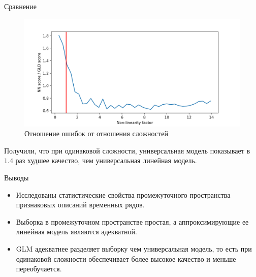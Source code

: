 \documentclass{beamer}
\begin{document}
\begin{frame}{Сравнение}
    \begin{figure}[ht]
        \centering
          \includegraphics[width=\textwidth]{../pics/loss_and_std_of_nl_factor.png}
          \caption{Отношение ошибок от отношения сложностей}
    \end{figure}

    Получили, что при одинаковой сложности, универсальная модель показывает
    в $1.4$ раз худшее качество, чем универсальная линейная модель.

\end{frame}
\begin{frame}{Выводы}
    \begin{itemize}
        \item Исследованы статистические свойства промежуточного пространства
        признаковых описаний временных рядов.
        \item Выборка в промежуточном пространстве простая,
        а аппроксимирующие ее линейная модель являются адекватной.
        \item GLM адекватнее разделяет выборку чем универсальная модель, то есть
        при одинаковой сложности обеспечивает более высокое качество и меньше переобучается.
    \end{itemize}
\end{frame}

\end{document}
